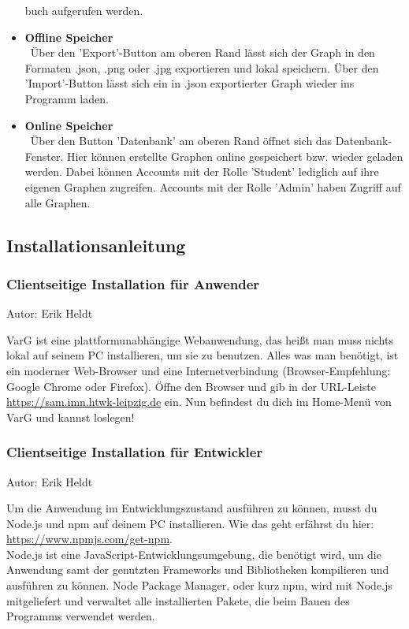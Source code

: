 \documentclass[twoside]{report}
\begin{document}
\begin{itemize}
buch aufgerufen werden.
  \item \textbf{ Offline Speicher }
    \\\
      Über den 'Export'-Button am oberen Rand lässt sich der Graph in den Formaten .json, .png oder .jpg exportieren und lokal speichern. Über den 'Import'-Button lässt sich ein in .json exportierter Graph wieder ins Programm laden.
  \item \textbf{ Online Speicher }
    \\\
      Über den Button 'Datenbank' am oberen Rand öffnet sich das Datenbank-Fenster. Hier können erstellte Graphen online gespeichert bzw. wieder geladen werden. Dabei können Accounts mit der Rolle 'Student' lediglich auf ihre eigenen Graphen zugreifen. Accounts mit der Rolle 'Admin' haben Zugriff auf alle Graphen.
\end{itemize}


\subsection{Installationsanleitung}
\subsubsection{Clientseitige Installation für Anwender}
{\small Autor: Erik Heldt}

VarG ist eine plattformunabhängige Webanwendung, das heißt man muss nichts lokal auf seinem PC installieren, um sie zu benutzen. Alles was man benötigt, ist ein moderner Web-Browser und eine Internetverbindung (Browser-Empfehlung: Google Chrome oder Firefox). Öffne den Browser und gib in der URL-Leiste \url{https://sam.imn.htwk-leipzig.de} ein. Nun befindest du dich im Home-Menü von VarG und kannst loslegen!

\subsubsection{Clientseitige Installation für Entwickler}
{\small Autor: Erik Heldt}

Um die Anwendung im Entwicklungszustand ausführen zu können, musst du Node.js und npm auf deinem PC installieren. Wie das geht erfährst du hier: \url{https://www.npmjs.com/get-npm}.
\\Node.js ist eine JavaScript-Entwicklungsumgebung, die benötigt wird, um die Anwendung samt der genutzten Frameworks und Bibliotheken kompilieren und ausführen zu können. Node Package Manager, oder kurz npm, wird mit Node.js mitgeliefert und verwaltet alle installierten Pakete, die beim Bauen des Programms verwendet werden.
\end{document}
